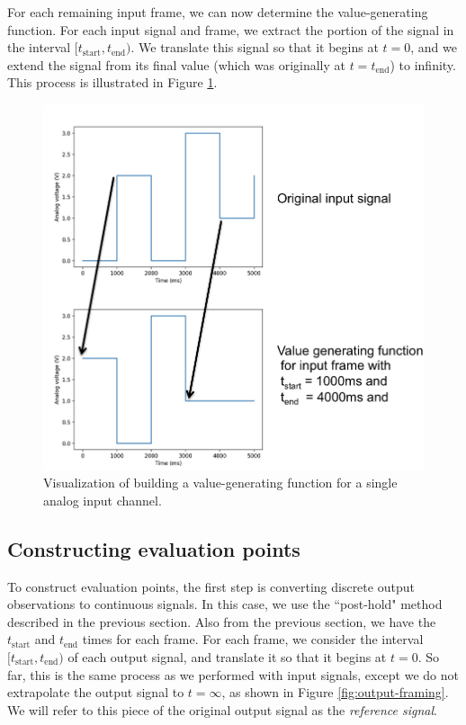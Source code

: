 \documentclass[12pt]{article}
\begin{document}
For each remaining input frame, we can now determine the value-generating function.  For each input signal and frame, we extract the portion of the signal in the interval $[t_{\text{start}},t_{\text{end}})$.  We translate this signal so that it begins at $t=0$, and we extend the signal from its final value (which was originally at $t=t_{\text{end}}$) to infinity.  This process is illustrated in Figure \ref{fig:input-framing}.

\begin{figure}[ht]
\centering
\includegraphics[width=0.6\linewidth]{input-framing.png}
\caption{Visualization of building a value-generating function for a single analog input channel.}
\label{fig:input-framing}
\end{figure}

\subsection{Constructing evaluation points}
\label{sec:using-point-templates}
To construct evaluation points, the first step is converting discrete output observations to continuous signals.  In this case, we use the ``post-hold" method described in the previous section.  Also from the previous section, we have the $t_{\text{start}}$ and $t_{\text{end}}$ times for each frame.  For each frame, we consider the interval $[t_{\text{start}}, t_{\text{end}})$ of each output signal, and translate it so that it begins at $t=0$.  So far, this is the same process as we performed with input signals, except we do not extrapolate the output signal to $t=\infty$, as shown in Figure \ref{fig:output-framing}.  We will refer to this piece of the original output signal as the \textit{reference signal}.  
\end{document}
